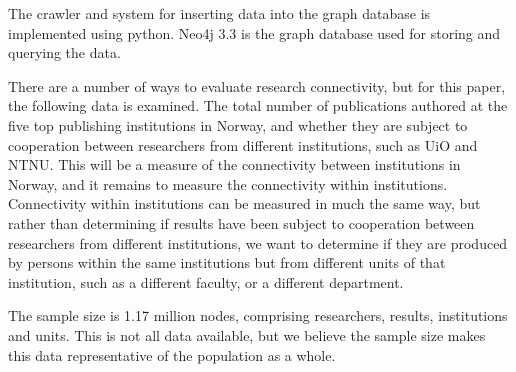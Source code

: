 The crawler and system for inserting data into the graph database is implemented using python.
Neo4j 3.3 is the graph database used for storing and querying the data.


There are a number of ways to evaluate research connectivity, but for this paper, the following data is examined.
The total number of publications authored at the five top publishing institutions in Norway, and whether they are subject to cooperation between researchers from different institutions, such as UiO and NTNU.
This will be a measure of the connectivity between institutions in Norway, and it remains to measure the connectivity within institutions.
Connectivity within institutions can be measured in much the same way, but rather than determining if results have been subject to cooperation between researchers from different institutions, we want to determine if they are produced by persons within the same institutions but from different units of that institution, such as a different faculty, or a different department.

The sample size is 1.17 million nodes, comprising researchers, results, institutions and units. This is not all data available, but we believe the sample size makes this data representative of the population as a whole.
